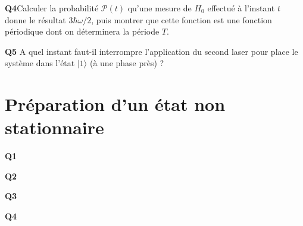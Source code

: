 \documentclass[french]{article}
\begin{document}
	\begin{tcolorbox}[colback=gray!5!white,colframe=gray!75!black]
		\textbf{\large{Q4}}Calculer la probabilité $\mathcal{P}(t)$ qu'une mesure de $H_0$ effectué à l'instant $t$ donne le résultat $3\hbar \omega /2$, puis montrer que cette fonction est une fonction périodique dont on déterminera la période $T$. 
	\end{tcolorbox}

	\begin{tcolorbox}[colback=gray!5!white,colframe=gray!75!black]
		\textbf{\large{Q5}} A quel instant faut-il interrompre l'application du second laser pour place le système dans l'état $|1\rangle$ (à une phase près) ? 
	\end{tcolorbox}

	\section{Préparation d'un état non stationnaire}

	\begin{tcolorbox}[colback=gray!5!white,colframe=gray!75!black]
		\textbf{\large{Q1}} 
	\end{tcolorbox}

	\begin{tcolorbox}[colback=gray!5!white,colframe=gray!75!black]
		\textbf{\large{Q2}} 
	\end{tcolorbox}

	\begin{tcolorbox}[colback=gray!5!white,colframe=gray!75!black]
		\textbf{\large{Q3}} 
	\end{tcolorbox}

	\begin{tcolorbox}[colback=gray!5!white,colframe=gray!75!black]
		\textbf{\large{Q4}} 
	\end{tcolorbox}
	
\end{document}
